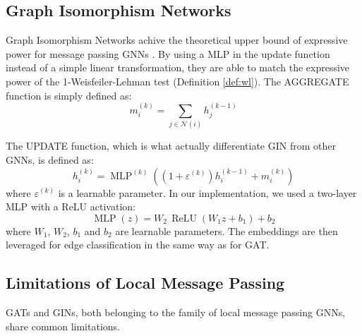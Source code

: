\subsection{Graph Isomorphism Networks}
\label{sec:gin}
Graph Isomorphism Networks achive the theoretical upper bound of expressive power for message passing GNNs \cite{xu2019gin}. By using a MLP in the update function instead of a simple linear transformation, they are able to match the expressive power of the 1-Weisfeiler-Lehman test (Definition \ref{def:wl}).
The AGGREGATE function is simply defined as:
\begin{equation}
  m_i^{(k)} = \sum_{j \in \mathcal{N}(i)} h_j^{(k-1)}
\end{equation}

The UPDATE function, which is what actually differentiate GIN from other GNNs, is defined as:
\begin{equation}
  h_i^{(k)} = \operatorname{MLP}^{(k)}\!\left( \left(1 + \varepsilon^{(k)}\right) h_i^{(k-1)} + m_i^{(k)} \right)
\end{equation}
where \(\varepsilon^{(k)}\) is a learnable parameter. In our implementation, we used a two-layer MLP with a ReLU activation:
\begin{equation}
  \operatorname{MLP}(z) = W_2\,\operatorname{ReLU}\!\left(W_1 z + b_1\right) + b_2
\end{equation}
where \(W_1\), \(W_2\), \(b_1\) and \(b_2\) are learnable parameters.
The embeddings are then leveraged for edge classification in the same way as for GAT.

\subsection{Limitations of Local Message Passing}
\label{sec:mp_limits}
GATs and GINs, both belonging to the family of local message passing GNNs, share common limitations.
